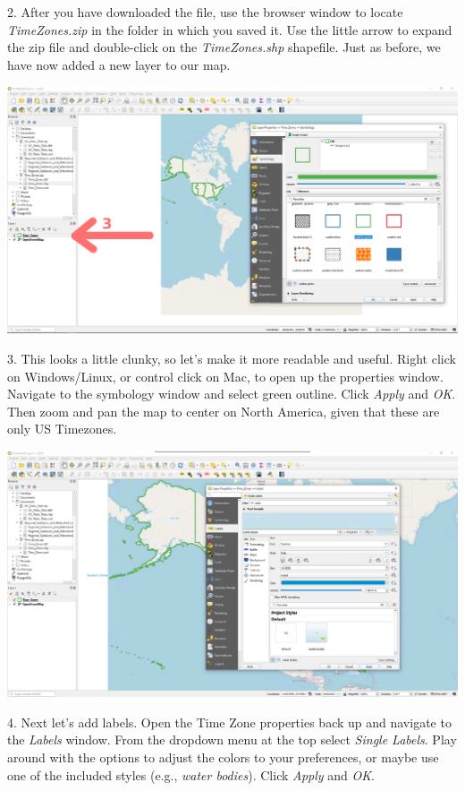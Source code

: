\documentclass[oneside,a4paper,11pt,explicit]{book}
\begin{document}
2. After you have downloaded the file, use the browser window to locate \textit{Time\textunderscore Zones.zip} in the folder in which you saved it. Use the little arrow to expand the zip file and double-click on the \textit{Time\textunderscore Zones.shp} shapefile. Just as before, we have now added a new layer to our map.

\centerline{\includegraphics[width=\textwidth]{TimeZoneSymbol.png}}

3. This looks a little clunky, so let's make it more readable and useful. Right click on Windows/Linux, or control click on Mac, to open up the properties window. Navigate to the symbology window and select green outline. Click \textit{Apply} and \textit{OK}.  Then zoom and pan the map to center on North America, given that these are only US Timezones.

\centerline{\includegraphics[width=\textwidth]{TimeZoneLabels.png}}

4. Next let's add labels. Open the Time Zone properties back up and navigate to the \textit{Labels} window. From the dropdown menu at the top select \textit{Single Labels}. Play around with the options to adjust the colors to your preferences, or maybe use one of the included styles (e.g., \textit{water bodies}). Click \textit{Apply} and \textit{OK}. 
\end{document}
